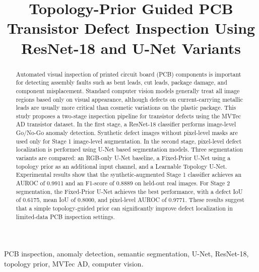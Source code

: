 \documentclass[conference,a4paper]{IEEEtran}
\begin{document}
\title{Topology-Prior Guided PCB Transistor Defect Inspection Using ResNet-18 and U-Net Variants}

\author{
}


\maketitle

\begin{abstract}
Automated visual inspection of printed circuit board (PCB) components is important for detecting assembly faults such as bent leads, cut leads, package damage, and component misplacement. Standard computer vision models generally treat all image regions based only on visual appearance, although defects on current-carrying metallic leads are usually more critical than cosmetic variations on the plastic package. This study proposes a two-stage inspection pipeline for transistor defects using the MVTec AD transistor dataset. In the first stage, a ResNet-18 classifier performs image-level Go/No-Go anomaly detection. Synthetic defect images without pixel-level masks are used only for Stage 1 image-level augmentation. In the second stage, pixel-level defect localization is performed using U-Net based segmentation models. Three segmentation variants are compared: an RGB-only U-Net baseline, a Fixed-Prior U-Net using a topology prior as an additional input channel, and a Learnable Topology U-Net. Experimental results show that the synthetic-augmented Stage 1 classifier achieves an AUROC of 0.9911 and an F1-score of 0.8889 on held-out real images. For Stage 2 segmentation, the Fixed-Prior U-Net achieves the best performance, with a defect IoU of 0.6175, mean IoU of 0.8000, and pixel-level AUROC of 0.9771. These results suggest that a simple topology-guided prior can significantly improve defect localization in limited-data PCB inspection settings.
\end{abstract}

\begin{IEEEkeywords}
PCB inspection, anomaly detection, semantic segmentation, U-Net, ResNet-18, topology prior, MVTec AD, computer vision.
\end{IEEEkeywords}
\end{document}
